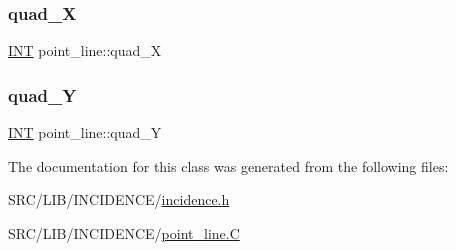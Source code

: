 \mbox{\label{classpoint__line_a944d382ae5b600be7d9e50f2f61fdf92}} 
\subsubsection{\texorpdfstring{quad\+\_\+X}{quad\_X}}
{\footnotesize\ttfamily \mbox{\hyperlink{galois_8h_a09fddde158a3a20bd2dcadb609de11dc}{I\+NT}} point\+\_\+line\+::quad\+\_\+X}

\mbox{\label{classpoint__line_af9dd8d5d79e08b689aad694edfb96398}} 
\subsubsection{\texorpdfstring{quad\+\_\+Y}{quad\_Y}}
{\footnotesize\ttfamily \mbox{\hyperlink{galois_8h_a09fddde158a3a20bd2dcadb609de11dc}{I\+NT}} point\+\_\+line\+::quad\+\_\+Y}



The documentation for this class was generated from the following files\+:\begin{DoxyCompactItemize}
\item 
S\+R\+C/\+L\+I\+B/\+I\+N\+C\+I\+D\+E\+N\+C\+E/\mbox{\hyperlink{incidence_8h}{incidence.\+h}}\item 
S\+R\+C/\+L\+I\+B/\+I\+N\+C\+I\+D\+E\+N\+C\+E/\mbox{\hyperlink{point__line_8_c}{point\+\_\+line.\+C}}\end{DoxyCompactItemize}
